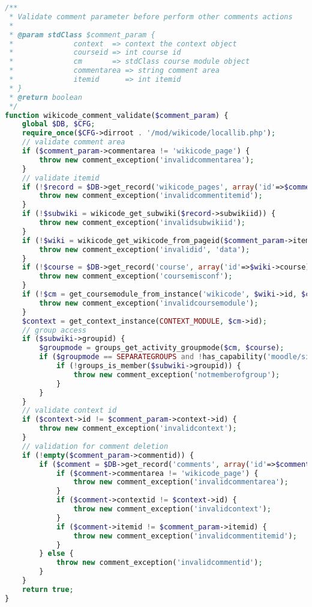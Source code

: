 \begin{lstlisting}[language=PHP]
/**
 * Validate comment parameter before perform other comments actions
 *
 * @param stdClass $comment_param {
 *              context  => context the context object
 *              courseid => int course id
 *              cm       => stdClass course module object
 *              commentarea => string comment area
 *              itemid      => int itemid
 * }
 * @return boolean
 */
function wikicode_comment_validate($comment_param) {
    global $DB, $CFG;
    require_once($CFG->dirroot . '/mod/wikicode/locallib.php');
    // validate comment area
    if ($comment_param->commentarea != 'wikicode_page') {
        throw new comment_exception('invalidcommentarea');
    }
    // validate itemid
    if (!$record = $DB->get_record('wikicode_pages', array('id'=>$comment_param->itemid))) {
        throw new comment_exception('invalidcommentitemid');
    }
    if (!$subwiki = wikicode_get_subwiki($record->subwikiid)) {
        throw new comment_exception('invalidsubwikiid');
    }
    if (!$wiki = wikicode_get_wikicode_from_pageid($comment_param->itemid)) {
        throw new comment_exception('invalidid', 'data');
    }
    if (!$course = $DB->get_record('course', array('id'=>$wiki->course))) {
        throw new comment_exception('coursemisconf');
    }
    if (!$cm = get_coursemodule_from_instance('wikicode', $wiki->id, $course->id)) {
        throw new comment_exception('invalidcoursemodule');
    }
    $context = get_context_instance(CONTEXT_MODULE, $cm->id);
    // group access
    if ($subwiki->groupid) {
        $groupmode = groups_get_activity_groupmode($cm, $course);
        if ($groupmode == SEPARATEGROUPS and !has_capability('moodle/site:accessallgroups', $context)) {
            if (!groups_is_member($subwiki->groupid)) {
                throw new comment_exception('notmemberofgroup');
            }
        }
    }
    // validate context id
    if ($context->id != $comment_param->context->id) {
        throw new comment_exception('invalidcontext');
    }
    // validation for comment deletion
    if (!empty($comment_param->commentid)) {
        if ($comment = $DB->get_record('comments', array('id'=>$comment_param->commentid))) {
            if ($comment->commentarea != 'wikicode_page') {
                throw new comment_exception('invalidcommentarea');
            }
            if ($comment->contextid != $context->id) {
                throw new comment_exception('invalidcontext');
            }
            if ($comment->itemid != $comment_param->itemid) {
                throw new comment_exception('invalidcommentitemid');
            }
        } else {
            throw new comment_exception('invalidcommentid');
        }
    }
    return true;
}


\end{lstlisting}
